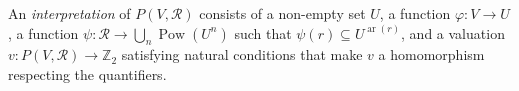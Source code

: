 An \emph{interpretation} of $P(V, \mathcal{R})$ consists of a non-empty set $U$, a function $\varphi: V \to U$, a function $\psi: \mathcal{R} \to \bigcup_n \operatorname{Pow}(U^n)$ such that $\psi(r) \subseteq U^{\operatorname{ar}(r)}$, and a valuation $v: P(V, \mathcal{R}) \to \mathbb{Z}_2$ satisfying natural conditions that make $v$ a homomorphism respecting the quantifiers.
